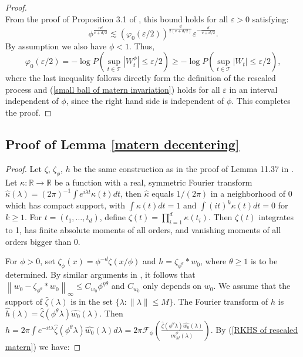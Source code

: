\documentclass[ejs,noshowframe]{imsart}
\theoremstyle{plain}
\theoremstyle{definition}
\theoremstyle{remark}
\begin{document}
\begin{appendix}
\begin{proof}
\begin{equation}
\end{equation}
From the proof of Proposition 3.1 of \citet{li1999approximation}, this bound holds for all $\varepsilon >0$ satisfying:
\begin{displaymath}
    \phi^{\frac{vd}{v+d/2}} \lesssim (\varphi_0(\varepsilon/2))^{\frac{d}{2(v+d/2)}} \varepsilon^{-\frac{d}{v+d/2}}.
\end{displaymath}
 By assumption  we also have $\phi<1$. Thus, 
 $$
\varphi_0(\varepsilon/2) = - \log P\left(\sup_{t \in \mathcal{T}} |W_t^\phi| \le \varepsilon/2\right)  \ge - \log P\left(\sup_{ t \in \mathcal{T}} |W_t | \le \varepsilon/2\right),
$$
where the last inequality follows directly form the definition of the  rescaled process and 
 (\ref{small ball of matern invariation}) holds for all
 $\varepsilon$ in an interval independent of $\phi$, since the right hand side is independent of $\phi$. This  completes the proof.
\end{proof}

\subsection{Proof of Lemma \ref{matern decentering}} \label{proof matern decentering}
\begin{proof}
Let $\zeta$, $\zeta_{\phi}$, $h$ be the same construction as in the proof of Lemma 11.37 in \cite{ghosal2017fundamentals}. Let $\kappa: \mathbb{R} \rightarrow \mathbb{R}$ be a function with a real, symmetric Fourier transform $\hat{\kappa}(\lambda)=(2 \pi)^{-1}\int e^{i \lambda t} \kappa(t) d t$, then $\hat{\kappa}$ equals $1/(2 \pi)$ in a neighborhood of 0 which has compact support, with  $\int \kappa(t) d t=1$ and $\int(i t)^k \kappa(t) d t=0$ for $k \geq 1$. For $t=\left(t_1, \ldots, t_d\right)$, define $\zeta(t)=\prod_{i=1}^{d}\kappa\left(t_i\right)$. Then $\zeta(t)$ integrates to 1, has finite absolute moments of all orders, and vanishing moments of all orders bigger than 0.

For $\phi>0$, set $\zeta_\phi(x)=\phi^{-d} \zeta(x / \phi)$ and $h=\zeta_{\phi^{\theta}}* w_0$, where $\theta \ge 1$ is to be determined. By similar arguments in \cite{van2009adaptive}, it follows that $\left\|w_0-\zeta_{\phi^\theta} * w_0\right\|_{\infty} \leq C_{w_0} \phi^{\eta \theta}$ and $C_{w_0}$ only depends on $w_0$. We assume that the support of $\hat{\zeta}(\lambda)$ is in the set $\{\lambda:\|\lambda\| \le M\}$. The Fourier transform of $h$ is  $\hat{h}(\lambda)=\hat{\zeta}(\phi^{\theta} \lambda)\hat{w_0}(\lambda)$. Then $h  =  2 \pi \int e^{-it\lambda} \hat{\zeta}(\phi^{\theta} \lambda)\hat{w_0}(\lambda) d \lambda = 2 \pi \mathcal{F}_{\phi}\left( \frac{\hat{\zeta}(\phi^{\theta} \lambda)\hat{w_0}(\lambda)}{m_M^{\phi}(\lambda)}\right)$.
By (\ref{RKHS of rescaled matern})  we have: 


\end{proof}
\end{appendix}
\end{document}
